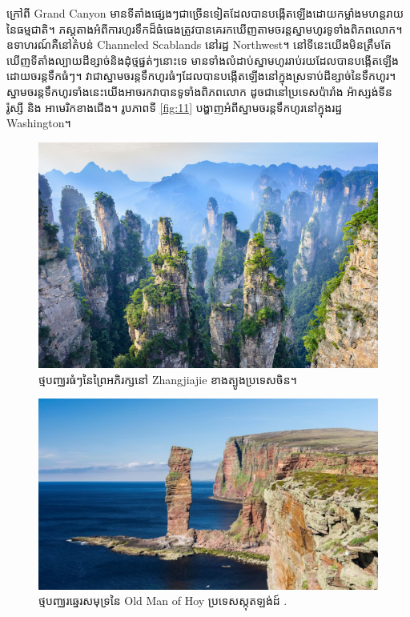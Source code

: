 \documentclass[10pt,twocolumn,letterpaper]{article}
\begin{document}
ក្រៅពី Grand Canyon មានទីតាំងផ្សេងៗជាច្រើនទៀតដែលបានបង្កើតឡើងដោយកម្លាំងមហន្តរាយនៃធម្មជាតិ។ ភស្តុតាងអំពីការហូរទឹកដ៏ធំធេងត្រូវបានគេរកឃើញតាមចរន្តស្នាមហូរទូទាំងពិភពលោក។ ឧទាហរណ៍គឺនៅតំបន់ Channeled Scablands នៅរដ្ឋ Northwest។ នៅទីនេះយើងមិនត្រឹមតែឃើញទីតាំងល្បាយដីខ្សាច់និងដុំថ្មផ្នត់ៗនោះទេ មានទាំងលំដាប់ស្នាមហូររាប់រយដែលបានបង្កើតឡើងដោយចរន្តទឹកធំៗ\cite{78,79}។ វាជាស្នាមចរន្តទឹកហូរធំៗដែលបានបង្កើតឡើងនៅក្នុងស្រទាប់ដីខ្សាច់នៃទឹកហូរ។ ស្នាមចរន្តទឹកហូរទាំងនេះយើងអាចរកវាបានទូទាំងពិភពលោក ដូចជានៅប្រទេសប៉ារាំង អ៉ាស្សង់ទីន រ៉ូស្សី និង អាមេរិកខាងជើង\cite{81}។ រូបភាពទី \ref{fig:11} បង្ហាញអំពីស្នាមចរន្តទឹកហូរនៅក្នុងរដ្ឋ Washington\cite{80}។

\begin{figure}[b]
\begin{center}
   \includegraphics[width=1\linewidth]{zhangjiajie.jpg}
\end{center}
   \caption{ថ្មបញ្ឈរធំៗនៃព្រៃអភិរក្សនៅ Zhangjiajie ខាងត្បូងប្រទេសចិន។}
\label{fig:12}
\label{fig:onecol}
\end{figure}

\begin{figure}[b]
\begin{center}

   \includegraphics[width=1\linewidth]{hoy.jpg}
\end{center}
   \caption{ថ្មបញ្ឈរឆ្នេរសមុទ្រនៃ Old Man of Hoy ប្រទេសស្កុតឡង់ដ៍ \cite{83}.}
\label{fig:13}
\label{fig:onecol}
\end{figure}
\end{document}
